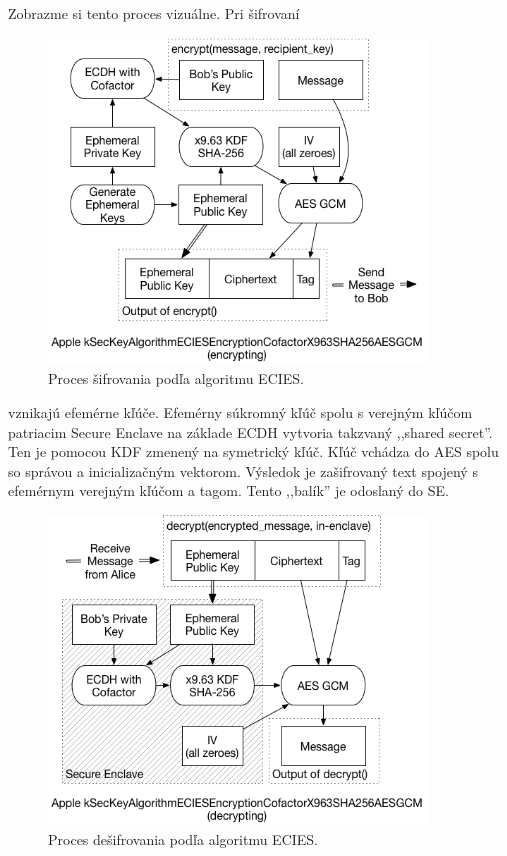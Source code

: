 \noindent Zobrazme si tento proces vizuálne. Pri šifrovaní
\begin{figure}[H]
  \centering
  \includegraphics[width=10cm]{img/ecies-arch-encrypt.png}
  \caption{Proces šifrovania podľa algoritmu ECIES.}
  \label{SEencr}
\end{figure}

\noindent vznikajú efemérne kľúče. Efemérny súkromný kľúč spolu s verejným kľúčom patriacim Secure Enclave na základe ECDH vytvoria takzvaný ,,shared secret''. Ten je pomocou KDF zmenený na symetrický kľúč. Kľúč vchádza do AES spolu so správou a inicializačným vektorom. Výsledok je zašifrovaný text spojený s efemérnym verejným kľúčom a tagom. Tento ,,balík'' je odoslaný do SE. 
\begin{figure}[H]
  \centering
  \includegraphics[width=10cm]{img/ecies-arch-decrypt.png}
  \caption{Proces dešifrovania podľa algoritmu ECIES.}
  \label{SEdecr}
\end{figure}

